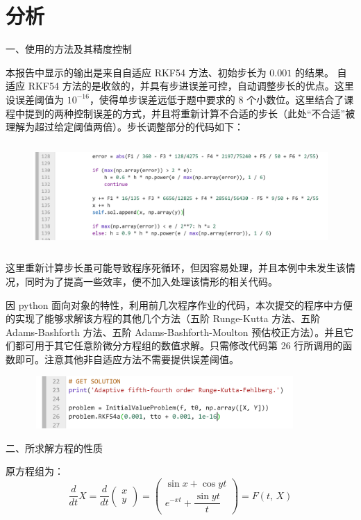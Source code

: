 \documentclass{ctexart}
\begin{document}
\section*{分析}
	\noindent 一、使用的方法及其精度控制
	
	本报告中显示的输出是来自自适应 RKF54 方法、初始步长为 $0.001$ 的结果。 自适应 RKF54 方法的是收敛的，并具有步进误差可控，自动调整步长的优点。这里设误差阈值为 $10^{-16}$，使得单步误差远低于题中要求的 8 个小数位。这里结合了课程中提到的两种控制误差的方式，并且将重新计算不合适的步长（此处“不合适”被理解为超过给定阈值两倍）。步长调整部分的代码如下：
	\begin{figure}[H]
		\centering
		\includegraphics[width = 14cm, height = 4cm]{handle-error.png}
	\end{figure}

	这里重新计算步长虽可能导致程序死循环，但因容易处理，并且本例中未发生该情况，同时为了提高一些效率，便不加入处理该情形的相关代码。
	
	因 python 面向对象的特性，利用前几次程序作业的代码，本次提交的程序中方便的实现了能够求解该方程的其他几个方法（五阶 Runge-Kutta 方法、五阶 Adams-Bashforth 方法、五阶 Adams-Bashforth-Moulton 预估校正方法）。并且它们都可用于其它任意阶微分方程组的数值求解。只需修改代码第 26 行所调用的函数即可。注意其他非自适应方法不需要提供误差阈值。
	\begin{figure}[H]
		\centering
		\includegraphics[width = 10cm, height = 2cm]{capture.png}
	\end{figure}
	
	\noindent 二、所求解方程的性质
	
	原方程组为：
	\begin{equation}
		\dfrac{d}{dt} X = \dfrac{d}{dt}\begin{pmatrix}
			x\\y
		\end{pmatrix} = \begin{pmatrix}
			\sin x + \cos yt \\
			e^{-xt} + \dfrac{\sin yt}{t}
		\end{pmatrix} = F(t,\,X)
	\end{equation}
	
\end{document}
